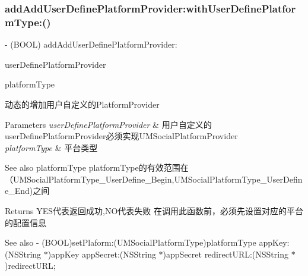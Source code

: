 \subsubsection{\texorpdfstring{add\+Add\+User\+Define\+Platform\+Provider\+:with\+User\+Define\+Platform\+Type\+:()}{addAddUserDefinePlatformProvider:withUserDefinePlatformType:()}\hspace{0.1cm}{\footnotesize\ttfamily [1/2]}}
{\footnotesize\ttfamily -\/ (B\+O\+OL) add\+Add\+User\+Define\+Platform\+Provider\+: \begin{DoxyParamCaption}\item[{(id$<$ U\+M\+Social\+Platform\+Provider $>$)}]{user\+Define\+Platform\+Provider }\item[{withUserDefinePlatformType:(U\+M\+Social\+Platform\+Type)}]{platform\+Type }\end{DoxyParamCaption}}

动态的增加用户自定义的\+Platform\+Provider


\begin{DoxyParams}{Parameters}
{\em user\+Define\+Platform\+Provider} & 用户自定义的user\+Define\+Platform\+Provider必须实现\+U\+M\+Social\+Platform\+Provider \\
\hline
{\em platform\+Type} & 平台类型 \\
\hline
\end{DoxyParams}
\begin{DoxySeeAlso}{See also}
platform\+Type platform\+Type的有效范围在 （\+U\+M\+Social\+Platform\+Type\+\_\+\+User\+Define\+\_\+\+Begin,U\+M\+Social\+Platform\+Type\+\_\+\+User\+Define\+\_\+\+End)之间
\end{DoxySeeAlso}
\begin{DoxyReturn}{Returns}
Y\+E\+S代表返回成功,N\+O代表失败  在调用此函数前，必须先设置对应的平台的配置信息 
\end{DoxyReturn}
\begin{DoxySeeAlso}{See also}
-\/ (B\+O\+OL)set\+Plaform\+:(\+U\+M\+Social\+Platform\+Type)platform\+Type app\+Key\+:(\+N\+S\+String $\ast$)app\+Key app\+Secret\+:(\+N\+S\+String $\ast$)app\+Secret redirect\+U\+R\+L\+:(\+N\+S\+String $\ast$)redirect\+U\+RL; 
\end{DoxySeeAlso}
\mbox{\label{interface_u_m_social_manager_acad90bcfe7865de06595c6466a227218}} 
